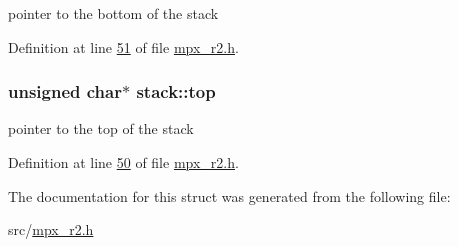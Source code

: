 pointer to the bottom of the stack 



Definition at line \hyperlink{mpx__r2_8h_source_l00051}{51} of file \hyperlink{mpx__r2_8h_source}{mpx\_\-r2.h}.

\hypertarget{structstack_adf145fa22a24464ff19409e2618a583d}{
\subsubsection[{top}]{\setlength{\rightskip}{0pt plus 5cm}unsigned char$\ast$ {\bf stack::top}}}
\label{structstack_adf145fa22a24464ff19409e2618a583d}


pointer to the top of the stack 



Definition at line \hyperlink{mpx__r2_8h_source_l00050}{50} of file \hyperlink{mpx__r2_8h_source}{mpx\_\-r2.h}.



The documentation for this struct was generated from the following file:\begin{DoxyCompactItemize}
\item 
src/\hyperlink{mpx__r2_8h}{mpx\_\-r2.h}\end{DoxyCompactItemize}
